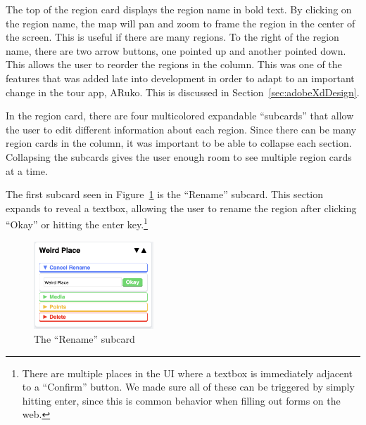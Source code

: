 \documentclass[a4paper, 10pt, american, titlepage]{article}
\begin{document}
The top of the region card displays the region name in bold text. By clicking
on the region name, the map will pan and zoom to frame the region in the center
of the screen. This is useful if there are many regions. To the right of the
region name, there are two arrow buttons, one pointed up and another pointed
down. This allows the user to reorder the regions in the column. This was one
of the features that was added late into development in order to adapt to an
important change in the tour app, ARuko. This is discussed in
Section~\ref{sec:adobeXdDesign}.

In the region card, there are four multicolored expandable ``subcards'' that
allow the user to edit different information about each region. Since there can
be many region cards in the column, it was important to be able to collapse
each section. Collapsing the subcards gives the user enough room to see
multiple region cards at a time.

The first subcard seen in Figure~\ref{fig:renameSubcard} is the ``Rename''
subcard. This section expands to reveal a textbox, allowing the user to rename
the region after clicking ``Okay'' or hitting the enter key.\footnote{There are
multiple places in the UI where a textbox is immediately adjacent to a
``Confirm'' button.  We made sure all of these can be triggered by simply
hitting enter, since this is common behavior when filling out forms on the web.}

\begin{figure}[p]
	\centering
	\includegraphics[width=0.4\textwidth]{rename-subcard-editour.png}
	\caption{The ``Rename'' subcard}
	\label{fig:renameSubcard}
\end{figure}
\end{document}
